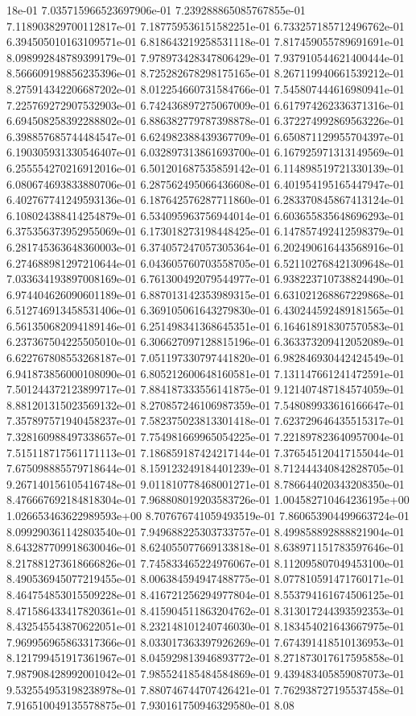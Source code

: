 18e-01	7.035715966523697906e-01	7.239288865085767855e-01	7.118903829700112817e-01	7.187759536151582251e-01	6.733257185712496762e-01	6.394505010163109571e-01	6.818643219258531118e-01	7.817459055789691691e-01	8.098992848789399179e-01	7.978973428347806429e-01	7.937910544621400444e-01	8.566609198856235396e-01	8.725282678298175165e-01	8.267119940661539212e-01	8.275914342206687202e-01	8.012254660731584766e-01	7.545807444616980941e-01	7.225769272907532903e-01	6.742436897275067009e-01	6.617974262336371316e-01	6.694508258392288802e-01	6.886382779787398878e-01	6.372274992869563226e-01	6.398857685744484547e-01	6.624982388439367709e-01	6.650871129955704397e-01	6.190305931330546407e-01	6.032897313861693700e-01	6.167925971313149569e-01	6.255554270216912016e-01	6.501201687535859142e-01	6.114898519721330139e-01	6.080674693833880706e-01	6.287562495066436608e-01	6.401954195165447947e-01	6.402767741249593136e-01	6.187642576287711860e-01	6.283370845867413124e-01	6.108024388414254879e-01	6.534095963756944014e-01	6.603655835648696293e-01	6.375356373952955069e-01	6.173018273198448425e-01	6.147857492412598379e-01	6.281745363648360003e-01	6.374057247057305364e-01	6.202490616443568916e-01	6.274688981297210644e-01	6.043605760703558705e-01	6.521102768421309648e-01	7.033634193897008169e-01	6.761300492079544977e-01	6.938223710738824490e-01	6.974404626090601189e-01	6.887013142353989315e-01	6.631021268867229868e-01	6.512746913458531406e-01	6.369105061643279830e-01	6.430244592489181565e-01	6.561350682094189146e-01	6.251498341368645351e-01	6.164618918307570583e-01	6.237367504225505010e-01	6.306627097128815196e-01	6.363373209412052089e-01	6.622767808553268187e-01	7.051197330797441820e-01	6.982846930442424549e-01	6.941873856000108090e-01	6.805212600648160581e-01	7.131147661241472591e-01	7.501244372123899717e-01	7.884187333556141875e-01	9.121407487184574059e-01	8.881201315023569132e-01	8.270857246106987359e-01	7.548089933616166647e-01	7.357897571940458237e-01	7.582375023813301418e-01	7.623729646435515317e-01	7.328160988497338657e-01	7.754981669965054225e-01	7.221897823640957004e-01	7.515118717561171113e-01	7.186859187424217144e-01	7.376545120417155044e-01	7.675098885579718644e-01	8.159123249184401239e-01	8.712444340842828705e-01	9.267140156105416748e-01	9.011810778468001271e-01	8.786644020343208350e-01	8.476667692184818304e-01	7.968808019203583726e-01	1.004582710464236195e+00	1.026653463622989593e+00	8.707676741059493519e-01	7.860653904499663724e-01	8.099290361142803540e-01	7.949688225303733757e-01	8.499858892888821904e-01	8.643287709918630046e-01	8.624055077669133818e-01	8.638971151783597646e-01	8.217881273618666826e-01	7.745833465224976067e-01	8.112095807049453100e-01	8.490536945077219455e-01	8.006384594947488775e-01	8.077810591471760171e-01	8.464754853015509228e-01	8.416721256294977804e-01	8.553794161674506125e-01	8.471586433417820361e-01	8.415904511863204762e-01	8.313017244393592353e-01	8.432545543870622051e-01	8.232148101240746030e-01	8.183454021643667975e-01	7.969956965863317366e-01	8.033017363397926269e-01	7.674391418510136953e-01	8.121799451917361967e-01	8.045929813946893772e-01	8.271873017617595858e-01	7.987908428992001042e-01	7.985524185484584869e-01	9.439483405859087073e-01	9.532554953198238978e-01	7.880746744707426421e-01	7.762938727195537458e-01	7.916510049135578875e-01	7.930161750946329580e-01	8.08